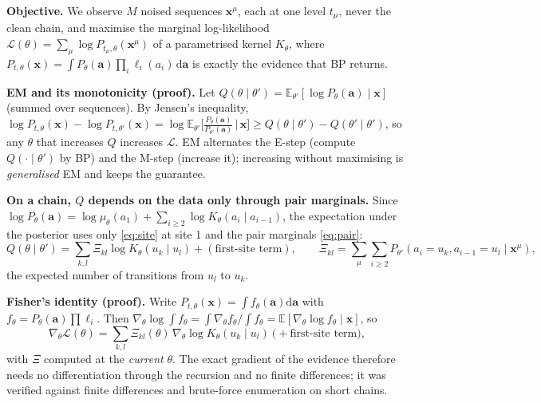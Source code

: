 \textbf{Objective.} We observe $M$ noised sequences $\mathbf x^\mu$, each at one level $t_\mu$, never the clean chain, and maximise the marginal log-likelihood
$\mathcal L(\theta)=\sum_\mu\log P_{t_\mu,\theta}(\mathbf x^\mu)$ of a parametrised kernel $K_\theta$, where $P_{t,\theta}(\mathbf x)=\int P_\theta(\mathbf a)\prod_i\ell_i(a_i)\,\mathrm d\mathbf a$ is exactly the evidence that BP returns.

\textbf{EM and its monotonicity (proof).} Let $Q(\theta\mid\theta')=\mathbb E_{\theta'}[\log P_\theta(\mathbf a)\mid\mathbf x]$ (summed over sequences). By Jensen's inequality,
$\log P_{t,\theta}(\mathbf x)-\log P_{t,\theta'}(\mathbf x)=\log\mathbb E_{\theta'}\!\big[\tfrac{P_\theta(\mathbf a)}{P_{\theta'}(\mathbf a)}\,\big|\,\mathbf x\big]\ge Q(\theta\mid\theta')-Q(\theta'\mid\theta')$, so any $\theta$ that increases $Q$ increases $\mathcal L$. EM
alternates the E-step (compute $Q(\cdot\mid\theta')$ by BP) and the M-step (increase it); increasing without maximising is \emph{generalised} EM and keeps the guarantee.

\textbf{On a chain, $Q$ depends on the data only through pair marginals.} Since $\log P_\theta(\mathbf a)=\log\mu_\theta(a_1)+\sum_{i\ge2}\log K_\theta(a_i\mid a_{i-1})$, the expectation under the posterior uses only \eqref{eq:site} at site 1 and the pair marginals \eqref{eq:pair}:
\begin{equation}\label{eq:Q}
Q(\theta\mid\theta')=\sum_{k,l}\Xi_{kl}\log K_\theta(u_k\mid u_l)+(\text{first-site term}),\qquad
\Xi_{kl}=\sum_\mu\sum_{i\ge2}P_{\theta'}(a_i{=}u_k,a_{i-1}{=}u_l\mid\mathbf x^\mu),
\end{equation}
the expected number of transitions from $u_l$ to $u_k$.

\textbf{Fisher's identity (proof).} Write $P_{t,\theta}(\mathbf x)=\int f_\theta(\mathbf a)\mathrm d\mathbf a$ with $f_\theta=P_\theta(\mathbf a)\prod\ell_i$. Then $\nabla_\theta\log\int f_\theta=\int\nabla_\theta f_\theta/\int f_\theta=\mathbb E[\nabla_\theta\log f_\theta\mid\mathbf x]$, so
\begin{equation}\label{eq:fisher}
\nabla_\theta\mathcal L(\theta)=\sum_{k,l}\Xi_{kl}(\theta)\,\nabla_\theta\log K_\theta(u_k\mid u_l)\ \Big(+\text{first-site term}\Big),
\end{equation}
with $\Xi$ computed at the \emph{current} $\theta$. The exact gradient of the evidence therefore needs no differentiation through the recursion and no finite differences; it was verified against finite differences and brute-force enumeration on short chains.

